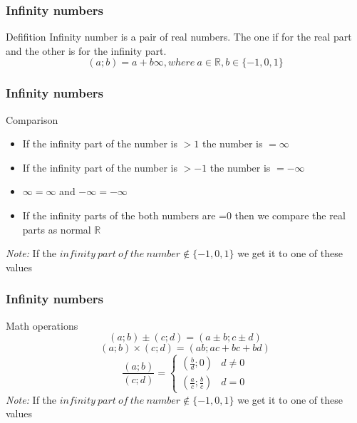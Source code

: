 \documentclass[12pt]{beamer}
\begin{document}
	\begin{frame}
		\frametitle{Infinity numbers}
		\begin{block}{Defifition}
			Infinity number is a pair of real numbers. The one if for the real part and the other is for the infinity part.
			$$ (a; b) = a + b\infty, where\ a \in \mathbb{R}, b \in \{-1, 0, 1\}$$
		\end{block}
	\end{frame}

	\begin{frame}
		\frametitle{Infinity numbers}
		\begin{block}{Comparison}
			\begin{itemize}
				\item If the infinity part of the number is $>1$ the number is $=\infty$
				\item If the infinity part of the number is $>-1$ the number is $=-\infty$
				\item $\infty = \infty$ and $-\infty = -\infty$
				\item If the infinity parts of the both numbers are =0 then we compare the real parts as normal $\mathbb{R}$
			\end{itemize}
			\small{\textit{Note:} If the $infinity\ part\ of\ the\ number \notin \{-1, 0, 1\}$ we get it to one of these values}
		\end{block}
	\end{frame}

	\begin{frame}
		\frametitle{Infinity numbers}
		\begin{block}{Math operations}
			$$ (a; b) \pm (c; d) = (a \pm b; c \pm d)$$
			$$ (a; b) \times (c; d) = (ab; ac + bc + bd)$$
			\[ \frac{ (a; b)}{ (c; d)} = 
				\begin{cases}
					 (\frac{b}{d}; 0)           & d \neq 0\\
					 (\frac{a}{c}; \frac{b}{c}) & d = 0
				\end{cases} 
            \]   
			\small{\textit{Note:} If the $infinity\ part\ of\ the\ number \notin \{-1, 0, 1\}$ we get it to one of these values}
		\end{block}
	\end{frame}
\end{document}
